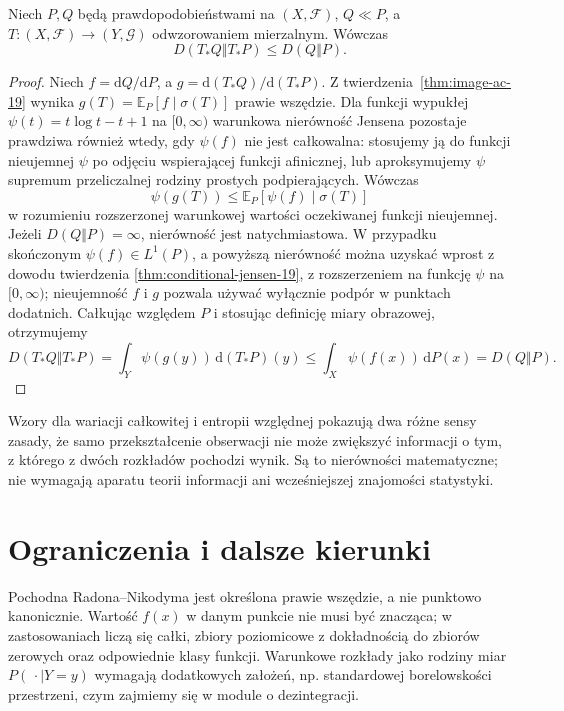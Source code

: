 \begin{twierdzenie}
\label{thm:kl-data-processing-19}
Niech $P,Q$ będą prawdopodobieństwami na $(X,\mathcal F)$,
$Q\ll P$, a $T:(X,\mathcal F)\to(Y,\mathcal G)$
odwzorowaniem mierzalnym. Wówczas
\[
 D(T_*Q\Vert T_*P)\le D(Q\Vert P).
\]
\end{twierdzenie}
\begin{proof}
Niech $f=\mathrm dQ/\mathrm dP$, a
$g=\mathrm d(T_*Q)/\mathrm d(T_*P)$.
Z twierdzenia~\ref{thm:image-ac-19} wynika
$g(T)=\mathbb E_P[f\mid\sigma(T)]$ prawie wszędzie.
Dla funkcji wypukłej
$\psi(t)=t\log t-t+1$ na $[0,\infty)$
warunkowa nierówność Jensena pozostaje prawdziwa
również wtedy, gdy $\psi(f)$ nie jest całkowalna:
stosujemy ją do funkcji nieujemnej $\psi$ po odjęciu
wspierającej funkcji afinicznej, lub aproksymujemy
$\psi$ supremum przeliczalnej rodziny prostych
podpierających. Wówczas
\[
 \psi(g(T))\le\mathbb E_P[\psi(f)\mid\sigma(T)]
\]
w rozumieniu rozszerzonej warunkowej wartości oczekiwanej
funkcji nieujemnej. Jeżeli $D(Q\Vert P)=\infty$,
nierówność jest natychmiastowa. W przypadku skończonym
$\psi(f)\in L^1(P)$, a powyższą nierówność można
uzyskać wprost z dowodu twierdzenia
\ref{thm:conditional-jensen-19}, z rozszerzeniem na funkcję
$\psi$ na $[0,\infty)$; nieujemność $f$ i $g$
pozwala używać wyłącznie podpór w punktach dodatnich.
Całkując względem $P$ i stosując definicję miary obrazowej,
otrzymujemy
\[
 D(T_*Q\Vert T_*P)
=\int_Y\psi(g(y))\,\mathrm d(T_*P)(y)
\le\int_X\psi(f(x))\,\mathrm dP(x)=D(Q\Vert P).
\]
\end{proof}

\begin{uwaga}[Interpretacja]
Wzory dla wariacji całkowitej i entropii względnej
pokazują dwa różne sensy zasady, że samo przekształcenie
obserwacji nie może zwiększyć informacji o tym,
z którego z dwóch rozkładów pochodzi wynik. Są to
nierówności matematyczne; nie wymagają aparatu teorii
informacji ani wcześniejszej znajomości statystyki.
\end{uwaga}

\section{Ograniczenia i dalsze kierunki}
Pochodna Radona--Nikodyma jest określona prawie wszędzie,
a nie punktowo kanonicznie. Wartość $f(x)$ w danym punkcie
nie musi być znacząca; w zastosowaniach liczą się całki,
zbiory poziomicowe z dokładnością do zbiorów zerowych
oraz odpowiednie klasy funkcji. Warunkowe rozkłady
jako rodziny miar $P(\,\cdot\mid Y=y)$ wymagają dodatkowych
założeń, np. standardowej borelowskości przestrzeni,
czym zajmiemy się w module o dezintegracji.
